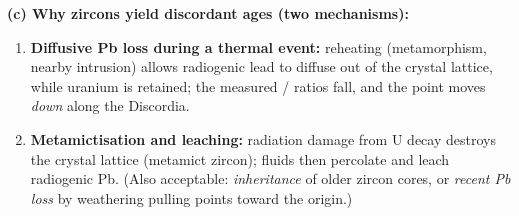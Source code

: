 \documentclass[11pt]{article}
\begin{document}
\begin{corrige}
\textbf{(c) Why zircons yield discordant ages (two mechanisms):}
\begin{enumerate}
\item \textbf{Diffusive Pb loss during a thermal event:} reheating (metamorphism, nearby intrusion) allows radiogenic lead to diffuse out of the crystal lattice, while uranium is retained; the measured / ratios fall, and the point moves \emph{down} along the Discordia.
\item \textbf{Metamictisation and leaching:} radiation damage from U decay destroys the crystal lattice (metamict zircon); fluids then percolate and leach radiogenic Pb. (Also acceptable: \emph{inheritance} of older zircon cores, or \emph{recent Pb loss} by weathering pulling points toward the origin.)
\end{enumerate}
\end{corrige}
\end{document}
